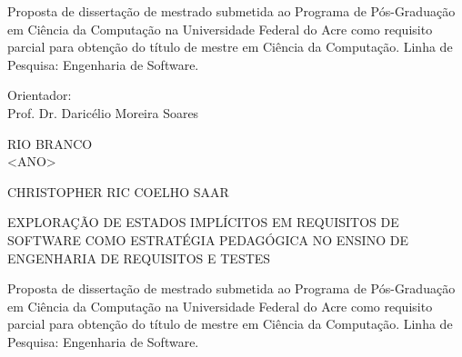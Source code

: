 \documentclass[ruledheader]{abnt_UFF}[abntex2]
\newcommand{\meunome}{CHRISTOPHER RIC COELHO SAAR}
\newcommand{\meutitulo}{EXPLORAÇÃO DE ESTADOS IMPLÍCITOS EM REQUISITOS DE SOFTWARE COMO ESTRATÉGIA PEDAGÓGICA NO ENSINO DE ENGENHARIA DE REQUISITOS E TESTES}
\newcommand{\meuorientador}{Prof. Dr. Daricélio Moreira Soares}
\newcommand{\meuano}{<ANO>}
\begin{document}
	\noindent
	  \begin{flushright}
	    \begin{minipage}[t]{8cm}
	      Proposta de dissertação de mestrado submetida ao Programa de Pós-Graduação em Ciência da Computação na Universidade Federal do Acre como requisito parcial para obtenção do título de mestre em Ciência da Computação. Linha de Pesquisa: Engenharia de Software.
	    \end{minipage}
	  \end{flushright}
	
	\vskip1.50cm
	  \begin{center}
	    \small Orientador: \\
	    \meuorientador\vskip3.5cm 
	  \end{center}
	  \begin{center}
	    \vspace{4mm}
	    RIO BRANCO \\
	    \meuano
	  \end{center}
	
	\thispagestyle{empty}
	\cleardoublepage
	\thispagestyle{empty}
	
	\vspace{-60mm}
	
	\begin{center}
	  {\large \meunome} \\
	  \vspace{7mm}
	
	  {\large \meutitulo} \\
	  \vspace{10mm}
	\end{center}
	
	\noindent
	\begin{flushright}
	  \begin{minipage}[t]{8cm}
	
		Proposta de dissertação de mestrado submetida ao Programa de Pós-Graduação em Ciência da Computação na Universidade Federal do Acre como requisito parcial para obtenção do título de mestre em Ciência da Computação. Linha de Pesquisa: Engenharia de Software.
	
	  \end{minipage}
	\end{flushright}
	
\end{document}
